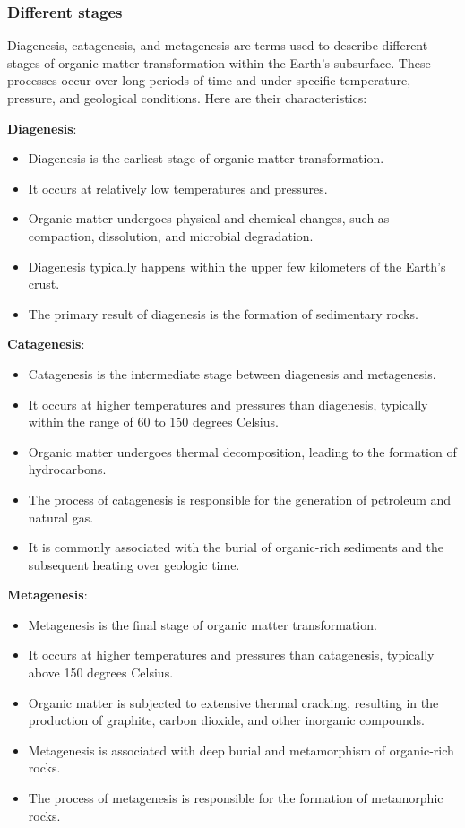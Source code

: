 \documentclass{article}
\begin{document}
\subsubsection*{Different stages}
Diagenesis, catagenesis, and metagenesis are terms used to describe different stages of organic matter transformation within the Earth's subsurface. These processes occur over long periods of time and under specific temperature, pressure, and geological conditions. Here are their characteristics:

\textbf{Diagenesis}:
    \begin{itemize}
        \item Diagenesis is the earliest stage of organic matter transformation.
        \item It occurs at relatively low temperatures and pressures.
        \item Organic matter undergoes physical and chemical changes, such as compaction, dissolution, and microbial degradation.
        \item Diagenesis typically happens within the upper few kilometers of the Earth's crust.
        \item The primary result of diagenesis is the formation of sedimentary rocks.
    \end{itemize}


\textbf{Catagenesis}:
    \begin{itemize}
        \item Catagenesis is the intermediate stage between diagenesis and metagenesis.
        \item It occurs at higher temperatures and pressures than diagenesis, typically within the range of 60 to 150 degrees Celsius.
        \item Organic matter undergoes thermal decomposition, leading to the formation of hydrocarbons.
        \item The process of catagenesis is responsible for the generation of petroleum and natural gas.
        \item It is commonly associated with the burial of organic-rich sediments and the subsequent heating over geologic time.
    \end{itemize}

\textbf{Metagenesis}:
    \begin{itemize}
        \item Metagenesis is the final stage of organic matter transformation.
        \item It occurs at higher temperatures and pressures than catagenesis, typically above 150 degrees Celsius.
        \item Organic matter is subjected to extensive thermal cracking, resulting in the production of graphite, carbon dioxide, and other inorganic compounds.
        \item Metagenesis is associated with deep burial and metamorphism of organic-rich rocks.
        \item The process of metagenesis is responsible for the formation of metamorphic rocks.
    \end{itemize}
\end{document}
